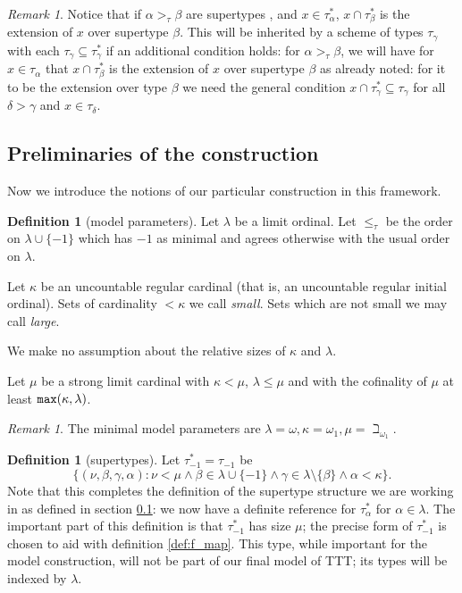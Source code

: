 \documentclass[112pt]{article}
\theoremstyle{definition}
\newtheorem{definition}[theorem]{Definition}
\theoremstyle{remark}
\newtheorem{remark}[theorem]{Remark}
\newcommand{\rk}[1]{{\color{blue}\sl #1}}
\begin{document}
\begin{remark}
Notice that if $\alpha>_\tau \beta$ are supertypes%
, and $x \in \tau^*_\alpha$, $x \cap \tau^*_\beta$ is the extension of $x$ over supertype $\beta$.  This will be inherited by a scheme of types $\tau_\gamma$ with each $\tau_\gamma \subseteq \tau^*_\gamma$ if an additional condition holds:  for $\alpha>_\tau\beta$, we will have
for $x \in \tau_\alpha$ that $x \cap \tau^*_\beta$ is the extension of $x$ over supertype $\beta$ as already noted:  for it to be the extension over type $\beta$ we need the general condition $x \cap \tau^*_\gamma \subseteq \tau_\gamma$ for all $\delta>\gamma$ and $x \in \tau_\delta$.
\end{remark}

\subsection{Preliminaries of the construction}
\label{ss:preliminaries}

Now we introduce the notions of our particular construction in this framework.
\begin{definition}[model parameters]\label{def:model_params}
Let $\lambda$ be a limit ordinal.  Let $\leq_\tau$ be the order on $\lambda \cup \{-1\}$ which has $-1$ as minimal and agrees otherwise with the usual order on $\lambda$.

Let $\kappa$ be an uncountable regular cardinal (that is, an uncountable  regular initial ordinal).  Sets of cardinality $<\kappa$ we call {\em small\/}.  Sets which are not small we may call {\em large\/}.

We make no assumption about the relative sizes of $\kappa$ and $\lambda$.

Let $\mu$ be a strong limit cardinal with $\kappa<\mu$, $\lambda \leq \mu$ and with the cofinality of $\mu$ at least ${\tt max}(\kappa,\lambda)$.
\end{definition}
\begin{remark}\label{rk:example_model_params}
{The minimal model parameters are $\lambda = \omega, \kappa = \omega_1, \mu = \beth_{\omega_1}$.}
\end{remark}

\begin{definition}[supertypes]\label{def:supertypes}
Let $\tau^*_{-1}=\tau_{-1}$ be $$\{(\nu,\beta,\gamma,\alpha):\nu<\mu \wedge  \beta \in \lambda\cup \{-1\} \wedge \gamma \in \lambda \setminus \{\beta\}\wedge \alpha<\kappa\}.$$  Note that this completes the definition of the supertype structure we are working in as defined in section \ref{ss:preliminaries}:  we now have a definite reference
for $\tau^*_\alpha$ for $\alpha\in \lambda$.
The important part of this definition is that $\tau_{-1}^*$ has size $\mu$; the precise form of $\tau_{-1}^*$ is chosen to aid with definition \ref{def:f_map}. This type, while important for the model construction, will not be part of our final model of TTT; its types will be indexed by $\lambda$.
\end{definition}
\end{document}
